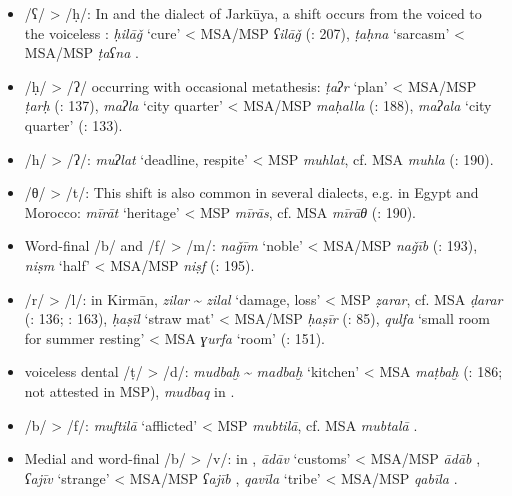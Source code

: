 \documentclass[output=paper]{langsci/langscibook}
\begin{document}
\begin{itemize}
\item[]
/ʕ/ > /ḥ/: In  and the dialect of Jarkūya, a shift occurs from the voiced to the voiceless : \textit{ḥilāǧ} ‘cure’ < MSA/MSP \textit{ʕilāǧ} (\citealt{Īzadpanāh2001}: 207), \textit{ṭaḥna} ‘sarcasm’ < MSA/MSP \textit{ṭaʕna} \citep{Borjian2008}.

\item[]
/ḥ/ > /ʔ/ occurring with occasional metathesis: \textit{ṭaʔr} ‘plan’ < MSA/MSP \textit{ṭarḥ} (\citealt{Ṣarrāfī1996}: 137), \textit{maʔla} ‘city quarter’ < MSA/MSP \textit{maḥalla} (\citealt{Ṣarrāfī1996}: 188), \textit{maʔala} ‘city quarter’ (\citealt{NaǧībiFīni2002}: 133).

\item[]
/h/ > /ʔ/: \textit{muʔlat} ‘deadline, respite’ < MSP \textit{muhlat}, cf. MSA \textit{muhla} (\citealt{Ṣarrāfī1996}: 190).

\item[]
/θ/ > /t/: This shift is also common in several  dialects, e.g. in Egypt and Morocco: \textit{mīrāt} ‘heritage’ < MSP \textit{mīrās}, cf. MSA \textit{mīrāθ} (\citealt{Īzadpanāh2001}: 190).

\item[]
Word-final /b/ and /f/ > /m/: \textit{naǧīm} ‘noble’ < MSA/MSP \textit{naǧīb} (\citealt{Īzadpanāh2001}: 193), \textit{niṣm} ‘half’ < MSA/MSP \textit{niṣf} (\citealt{Īzadpanāh2001}: 195).

\item[]
/r/ > /l/: in Kirmān, \textit{zilar} \~{} \textit{zilal} ‘damage, loss’ < MSP \textit{ẓarar}, cf. MSA \textit{ḍarar} (\citealt{Ṣarrāfī1996}: 136; \citealt{Dānišgar1995}: 163), \textit{ḥaṣīl} ‘straw mat’ < MSA/MSP \textit{ḥaṣīr} (\citealt{Ṣarrāfī1996}: 85), \textit{qulfa} ‘small room for summer resting’ < MSA \textit{ɣurfa} ‘room’ (\citealt{Fāẓilī2004}: 151).

\item[]
 voiceless dental  /ṭ/ > /d/: \textit{mudbaḫ} \~{} \textit{madbaḫ} ‘kitchen’ < MSA \textit{maṭbaḫ} (\citealt{Ṣarrāfī1996}: 186; not attested in MSP), \textit{mudbaq} in  \citep[251]{Sarlak2002}.

\item[]
/b/ > /f/: \emph{muftilā} ‘afflicted’ < MSP \textit{mubtilā}, cf. MSA  \textit{mubtalā} \citep{Borjian2017}.

\item[]
Medial and word-final /b/ > /v/: in , \textit{ādāv} ‘customs’ < MSA/MSP \textit{ādāb} \citep[15]{Sarlak2002}, \textit{ʕajīv} ‘strange’ < MSA/MSP \textit{ʕajīb} \citep[25]{Sarlak2002}, \textit{qavīla} ‘tribe’ < MSA/MSP \textit{qabīla} \citep[199]{Sarlak2002}.


\end{itemize}
\end{document}
